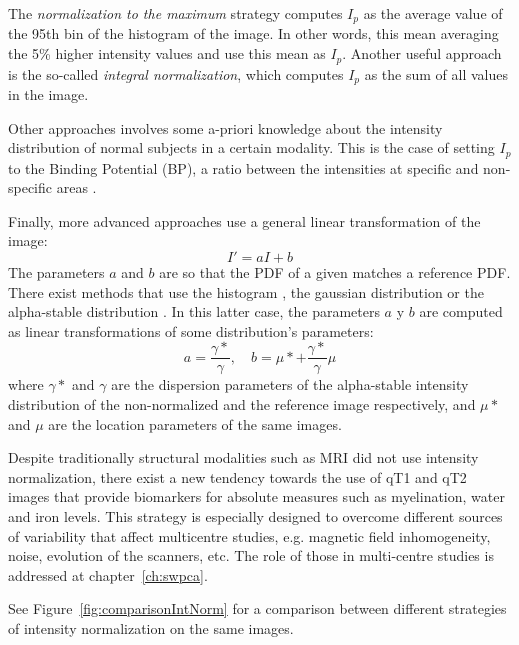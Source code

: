 The \emph{normalization to the maximum} strategy computes $I_p$ as the average value of the 95th bin of the histogram of the image. In other words, this mean averaging the 5\% higher intensity values and use this mean as $I_p$. Another useful approach is the so-called \emph{integral normalization}, which computes $I_p$ as the sum of all values in the image. 

Other approaches involves some a-priori knowledge about the intensity distribution of normal subjects in a certain modality. This is the case of setting $I_p$ to the Binding Potential (BP), a ratio between the intensities at specific and non-specific areas \cite{Scherfler2005}. 

Finally, more advanced approaches use a general linear transformation of the image: 
\begin{equation}
	I' = a I + b
\end{equation}
The parameters $a$ and $b$ are so that the \ac{PDF} of a given matches a reference \ac{PDF}. There exist methods that use the histogram \cite{Arndt1996}, the gaussian distribution or the alpha-stable distribution \cite{Salas-Gonzalez2013}. In this latter case, the parameters $a$ y $b$ are computed as linear transformations of some distribution's parameters: 
\begin{equation}
	a = \frac{\gamma*}{\gamma}, \quad b = \mu* + \frac{\gamma*}{\gamma} \mu
\end{equation}
where $\gamma*$ and $\gamma$ are the dispersion parameters of the alpha-stable intensity distribution of the non-normalized and the reference image respectively, and $\mu*$ and $\mu$ are the location parameters of the same images. 

Despite traditionally structural modalities such as \ac{MRI} did not use intensity normalization, there exist a new tendency towards the use of \ac{qT1} and \ac{qT2} images \cite{Weiskopf2013} that provide biomarkers for absolute measures such as myelination, water and iron levels. This strategy is especially designed to overcome different sources of variability that affect multicentre studies, e.g. magnetic field inhomogeneity, noise, evolution of the scanners, etc. The role of those in multi-centre studies is addressed at chapter~\ref{ch:swpca}. 

See Figure~\ref{fig:comparisonIntNorm} for a comparison between different strategies of intensity normalization on the same images. 

